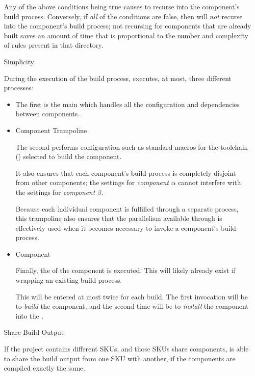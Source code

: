 \begin{description}
  Any of the above conditions being true causes \lmsbw to recurse into
  the component's build process.  Conversely, if \emph{all} of the
  conditions are false, then \lmsbw will \emph{not} recurse into the
  component's build process; not recursing for components that are
  already built saves an amount of time that is proportional to the
  number and complexity of \make rules present in that directory.

\item \makefile Simplicity

  During the execution of the build process, \lmsbw executes, at most,
  three different \makefile processes:

  \begin{itemize}
  \item \lmsbw \makefile

    The first is the main \lmsbw \makefile which handles all the
    configuration and dependencies between components.

  \item Component Trampoline \makefile

    The second \makefile performs configuration such as standard
    macros for the toolchain ()
    selected to build the component.

    It also ensures that each component's build process is completely
    disjoint from other components; the settings for \emph{component
      $\alpha$} cannot interfere with the settings for \emph{component
      $\beta$}.

    Because each individual component is fulfilled through a separate
    \make process, this trampoline also ensures that the parallelism
    available through \gnumake is effectively used when it becomes
    necessary to invoke a component's build process.

  \item Component \makefile

    Finally, the \makefile of the component is executed.  This will
    likely already exist if wrapping an existing build process.

    This \makefile will be entered at most twice for each build.  The
    first invocation will be to \emph{build} the component, and the
    second time will be to \emph{install} the component into the
    \destdir.
\end{itemize}

\item Share Build Output

  If the project contains different SKUs, and those SKUs share
  components, \lmsbw is able to share the build output from one SKU
  with another, if the components are compiled exactly the same.

\end{description}


